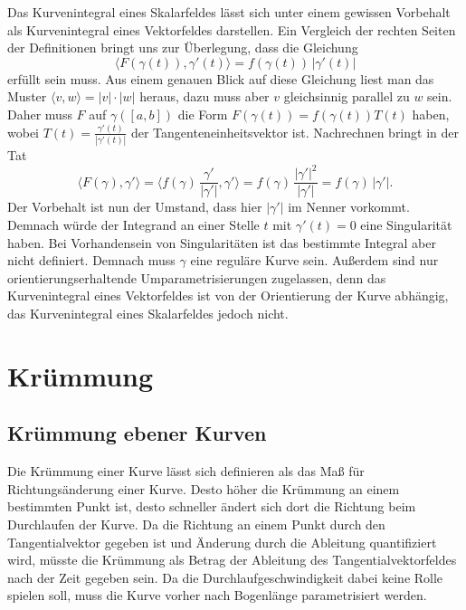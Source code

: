 Das Kurvenintegral eines Skalarfeldes lässt sich unter einem gewissen
Vorbehalt als Kurvenintegral eines Vektorfeldes darstellen.
Ein Vergleich der rechten Seiten der Definitionen bringt uns zur
Überlegung, dass die Gleichung
\begin{equation}
\langle F(\gamma(t)),\gamma'(t)\rangle = f(\gamma(t))\, |\gamma'(t)|
\end{equation}
erfüllt sein muss. Aus einem genauen Blick auf diese Gleichung liest
man das Muster $\langle v,w\rangle = |v|\cdot|w|$ heraus, dazu muss
aber $v$ gleichsinnig parallel zu $w$ sein. Daher muss $F$ auf
$\gamma([a,b])$ die Form $F(\gamma(t)) = f(\gamma(t))T(t)$ haben,
wobei $T(t)=\frac{\gamma'(t)}{|\gamma'(t)|}$ der
Tangenteneinheitsvektor ist. Nachrechnen bringt in der Tat
\begin{equation}
\langle F(\gamma),\gamma'\rangle
= \langle f(\gamma)\,\frac{\gamma'}{|\gamma'|},\gamma'\rangle
= f(\gamma)\,\frac{|\gamma'|^2}{|\gamma'|}
= f(\gamma)\,|\gamma'|.
\end{equation}
Der Vorbehalt ist nun der Umstand, dass hier $|\gamma'|$ im
Nenner vorkommt. Demnach würde der Integrand an einer Stelle $t$ mit
$\gamma'(t)=0$ eine Singularität haben. Bei Vorhandensein von
Singularitäten ist das bestimmte Integral aber nicht definiert.
Demnach muss $\gamma$ eine reguläre Kurve sein. Außerdem sind nur
orientierungserhaltende Umparametrisierungen zugelassen, denn
das Kurvenintegral eines Vektorfeldes ist von der Orientierung
der Kurve abhängig, das Kurvenintegral eines Skalarfeldes jedoch
nicht.

\section{Krümmung}
\subsection{Krümmung ebener Kurven}

Die Krümmung einer Kurve lässt sich definieren als das Maß für
Richtungsänderung einer Kurve. Desto höher die Krümmung an einem
bestimmten Punkt ist, desto schneller ändert sich dort die
Richtung beim Durchlaufen der Kurve. Da die Richtung an einem
Punkt durch den Tangentialvektor gegeben ist und Änderung
durch die Ableitung quantifiziert wird, müsste die Krümmung
als Betrag der Ableitung des Tangentialvektorfeldes nach der Zeit
gegeben sein. Da die Durchlaufgeschwindigkeit dabei keine Rolle spielen
soll, muss die Kurve vorher nach Bogenlänge parametrisiert werden.

